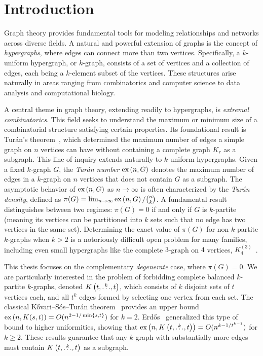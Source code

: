 \section{Introduction}\label{sec:introduction}

Graph theory provides fundamental tools for modeling relationships and networks across diverse fields.
A natural and powerful extension of graphs is the concept of \emph{hypergraphs}, where edges can connect more than two vertices.
Specifically, a $k$-uniform hypergraph, or $k$-graph, consists of a set of vertices and a collection of edges, each being a $k$-element subset of the vertices.
These structures arise naturally in areas ranging from combinatorics and computer science to data analysis and computational biology.

A central theme in graph theory, extending readily to hypergraphs, is \emph{extremal combinatorics}.
This field seeks to understand the maximum or minimum size of a combinatorial structure satisfying certain properties.
Its foundational result is Turán's theorem~\cite{Turan1941},
which determined the maximum number of edges a simple graph on $n$
vertices can have without containing a complete graph $K_r$ as a subgraph.
This line of inquiry extends naturally to $k$-uniform hypergraphs.
Given a fixed $k$-graph $G$, the \emph{Turán number} $\text{ex} \left( n, G \right)$ denotes the maximum number of edges in a $k$-graph on $n$ vertices that does not contain $G$ as a subgraph.
The asymptotic behavior of $\text{ex} \left( n, G \right)$ as $n \to \infty$
is often characterized by the \emph{Turán density}, defined as $\pi(G) = \lim_{n \to \infty} \text{ex} \left( n, G \right) / \binom{n}{k}$.
A fundamental result distinguishes between two regimes: $\pi(G) = 0$ if and only if $G$ is $k$-partite
(meaning its vertices can be partitioned into $k$ sets such that no edge has two vertices in the same set).
Determining the exact value of $\pi(G)$ for non-$k$-partite $k$-graphs when $k > 2$
is a notoriously difficult open problem for many families, including even small hypergraphs like the complete $3$-graph on $4$ vertices,
$K_4^{(3)}$~\cite{keevash2011hypergraph, razborov20103}.

This thesis focuses on the complementary \emph{degenerate} case, where $\pi(G) = 0$.
We are particularly interested in the problem of forbidding complete balanced $k$-partite $k$-graphs,
denoted $K\left(t, \overset{k}{\dots}, t\right)$, which consists of $k$ disjoint sets of $t$ vertices each,
and all $t^k$ edges formed by selecting one vertex from each set.
The classical Kővari--Sós--Turán theorem~\cite{Kovari1954, Hylten1958} provides an upper bound $\text{ex} \left( n, K(s, t) \right) = O(n^{2 - 1/\min\{s,t\}})$ for $k=2$.
Erdős~\cite{Erods1964} generalized this type of bound to higher uniformities, showing that $\text{ex} \left( n, K\left(t, \overset{k}{\dots}, t\right) \right) = O(n^{k - 1/t^{k-1}})$ for $k \ge 2$.
These results guarantee that any $k$-graph with substantially more edges must contain $K\left(t, \overset{k}{\dots}, t\right)$ as a subgraph.

